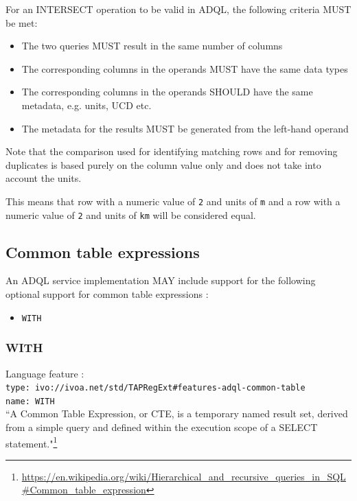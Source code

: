 \documentclass[11pt,a4paper]{ivoa}
\begin{document}
For an INTERSECT operation to be valid in ADQL, the following criteria MUST be met:

\begin{itemize}
    \item The two queries MUST result in the same number of columns
    \item The corresponding columns in the operands MUST have the same data types
    \item The corresponding columns in the operands SHOULD have the same metadata, e.g. units, UCD etc.
    \item The metadata for the results MUST be generated from the left-hand operand
\end{itemize}

Note that the comparison used for identifying matching rows and for removing
duplicates is based purely on the column value only and does not take into
account the units.

This means that row with a numeric value of \verb:2: and units of \verb:m:
and a row with a numeric value of \verb:2: and units of \verb:km: will be
considered equal.

\subsection{Common table expressions}
\label{sec:common-table}

An ADQL service implementation MAY include support for the following optional
support for common table expressions :

\begin{itemize}
    \item \verb:WITH:
\end{itemize}

\subsubsection{WITH}
{\footnotesize Language feature :}\\
{\footnotesize \verb|type: ivo://ivoa.net/std/TAPRegExt#features-adql-common-table|}\\
{\footnotesize \verb|name: WITH|}\\

``A Common Table Expression, or CTE, is a temporary named result set, derived
from a simple query and defined within the execution scope of a SELECT
statement."\footnote{\url{https://en.wikipedia.org/wiki/Hierarchical\_and\_recursive\_queries\_in\_SQL\#Common\_table\_expression}}
\end{document}

